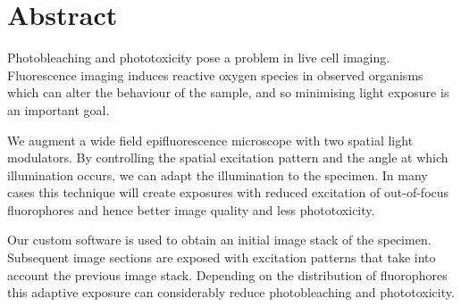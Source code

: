 \section*{Abstract}
\begin{summary}
Photobleaching and phototoxicity pose a problem in live cell
imaging. Fluorescence imaging induces reactive oxygen species in
observed organisms which can alter the behaviour of the sample, and so
minimising light exposure is an important goal.

We augment a wide field epifluorescence microscope with two spatial
light modulators. By controlling the spatial excitation pattern and
the angle at which illumination occurs, we can adapt the illumination
to the specimen. In many cases this technique will create exposures
with reduced excitation of out-of-focus fluorophores and hence better
image quality and less phototoxicity.

Our custom software is used to obtain an initial image stack of the
specimen. Subsequent image sections are exposed with excitation
patterns that take into account the previous image stack. Depending on
the distribution of fluorophores this adaptive exposure can
considerably reduce photobleaching and phototoxicity.
\end{summary}
